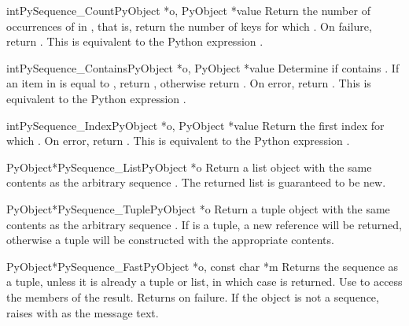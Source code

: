 \begin{cfuncdesc}{int}{PySequence_Count}{PyObject *o, PyObject *value}
  Return the number of occurrences of  in , that is,
  return the number of keys for which .  On failure, return .  This is equivalent to
  the Python expression .
\end{cfuncdesc}

\begin{cfuncdesc}{int}{PySequence_Contains}{PyObject *o, PyObject *value}
  Determine if  contains .  If an item in  is
  equal to , return , otherwise return .
  On error, return .  This is equivalent to the Python
  expression .
\end{cfuncdesc}

\begin{cfuncdesc}{int}{PySequence_Index}{PyObject *o, PyObject *value}
  Return the first index  for which .  On error, return .    This is equivalent to
  the Python expression .
\end{cfuncdesc}

\begin{cfuncdesc}{PyObject*}{PySequence_List}{PyObject *o}
  Return a list object with the same contents as the arbitrary
  sequence .  The returned list is guaranteed to be new.
\end{cfuncdesc}

\begin{cfuncdesc}{PyObject*}{PySequence_Tuple}{PyObject *o}
  Return a tuple object with the same contents as the arbitrary
  sequence .  If  is a tuple, a new reference will be
  returned, otherwise a tuple will be constructed with the appropriate
  contents.
\end{cfuncdesc}

\begin{cfuncdesc}{PyObject*}{PySequence_Fast}{PyObject *o, const char *m}
  Returns the sequence  as a tuple, unless it is already a
  tuple or list, in which case  is returned.  Use
   to access the members of the
  result.  Returns \NULL{} on failure.  If the object is not a
  sequence, raises  with  as the message
  text.
\end{cfuncdesc}

